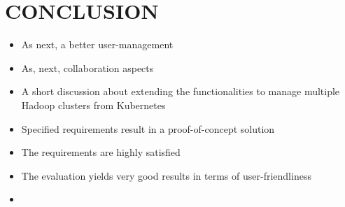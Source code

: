 \documentclass[a4paper,twoside]{article}
\begin{document}
\section{\uppercase{Conclusion}}

\begin{itemize}
    \item As next, a better user-management 
    \item As, next, collaboration aspects
    \item A short discussion about extending the functionalities to manage multiple Hadoop clusters from Kubernetes
\end{itemize}

\begin{itemize}
    \item Specified requirements result in a proof-of-concept solution
    \item The requirements are highly satisfied
    \item The evaluation yields very good results in terms of user-friendliness
    \item 
\end{itemize}



{\small
}
\end{document}
